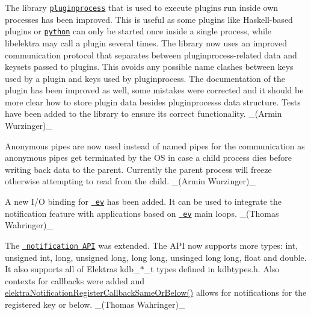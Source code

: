 \begin{DoxyItemize}
\item The library \href{http://master.libelektra.org/src/libs/pluginprocess}{\texttt{ {\ttfamily pluginprocess}}} that is used to execute plugins run inside own processes has been improved. This is useful as some plugins like Haskell-\/based plugins or \href{http://libelektra.org/plugins/python}{\texttt{ {\ttfamily python}}} can only be started once inside a single process, while libelektra may call a plugin several times. The library now uses an improved communication protocol that separates between pluginprocess-\/related data and keysets passed to plugins. This avoids any possible name clashes between keys used by a plugin and keys used by pluginprocess. The documentation of the plugin has been improved as well, some mistakes were corrected and it should be more clear how to store plugin data besides pluginprocess\textquotesingle{}s data structure. Tests have been added to the library to ensure its correct functionality. \+\_\+(\+Armin Wurzinger)\+\_\+
\item Anonymous pipes are now used instead of named pipes for the communication as anonymous pipes get terminated by the OS in case a child process dies before writing back data to the parent. Currently the parent process will freeze otherwise attempting to read from the child. \+\_\+(\+Armin Wurzinger)\+\_\+
\end{DoxyItemize}


\begin{DoxyItemize}
\item A new I/O binding for \href{https://www.libelektra.org/bindings/io_ev}{\texttt{ ev}} has been added. It can be used to integrate the notification feature with applications based on \href{http://libev.schmorp.de}{\texttt{ ev}} main loops. \+\_\+(\+Thomas Wahringer)\+\_\+
\end{DoxyItemize}


\begin{DoxyItemize}
\item The \href{https://doc.libelektra.org/api/current/html/group__kdbnotification.html}{\texttt{ notification A\+PI}} was extended. The A\+PI now supports more types\+: {\ttfamily int}, {\ttfamily unsigned int}, {\ttfamily long}, {\ttfamily unsigned long}, {\ttfamily long long}, {\ttfamily unsinged long long}, {\ttfamily float} and {\ttfamily double}. It also supports all of Elektra\textquotesingle{}s {\ttfamily kdb\+\_\+$\ast$\+\_\+t} types defined in {\ttfamily kdbtypes.\+h}. Also contexts for callbacks were added and {\ttfamily \mbox{\hyperlink{group__kdbnotification_ga374edd4f4fff527d6511ce4d0df62681}{elektra\+Notification\+Register\+Callback\+Same\+Or\+Below()}}} allows for notifications for the registered key or below. \+\_\+(\+Thomas Wahringer)\+\_\+
\end{DoxyItemize}


